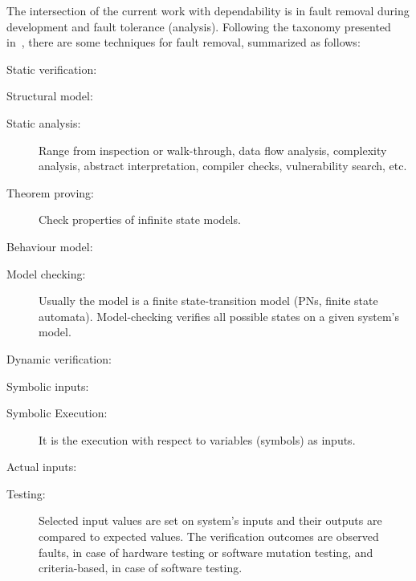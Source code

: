 \documentclass[12pt,openright,twoside,a4paper,oldfontcommands,english,brazil,final]{abntex2}
\theoremstyle{theo}
\begin{document}
\begin{sloppypar}
The intersection of the current work with dependability is in fault removal during development and fault tolerance (analysis).
Following the taxonomy presented in~\cite{ALR+2004}, there are some techniques for fault removal, summarized as follows:
\begin{alineas}
  \item Static verification:
  \begin{subalineas}
    \item Structural model:
    \begin{description}
      \item[Static analysis:] Range from inspection or walk-through, data flow analysis, complexity analysis, abstract interpretation, compiler checks, vulnerability search, etc.
      \item[Theorem proving:] Check properties of infinite state models.
    \end{description}
    \item Behaviour model:
    \begin{description}
      \item[Model checking:] Usually the model is a finite state-transition model (\acp{PN}, finite state automata).
      Model-checking verifies all possible states on a given system's model.
    \end{description}
  \end{subalineas}
  \item Dynamic verification:
  \begin{subalineas}
    \item Symbolic inputs:
    \begin{description}
      \item[Symbolic Execution:] It is the execution with respect to variables (symbols) as inputs.
    \end{description}
    \item Actual inputs:
    \begin{description}
      \item[Testing:] Selected input values are set on system's inputs and their outputs are compared to expected values.
      The verification outcomes are observed faults, in case of hardware testing or software mutation testing, and criteria-based, in case of software testing.
    \end{description}
  \end{subalineas}
\end{alineas}
\end{sloppypar}
\end{document}
